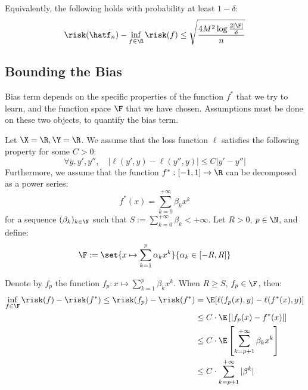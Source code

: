 \documentclass[toc, titlepaged]{../cs-classes/cs-classes}
\begin{document}
Equivalently, the following holds with probability at least $1-\delta$:
\begin{equation*}
    \risk(\hatf_n)-\inf_{f\in\R}\risk(f) \leq \sqrt{\frac{4M^2\log \frac{2|\F|}{\delta}}{n}}
\end{equation*}

\subsection{Bounding the Bias}
Bias term depends on the specific properties of the function $f^*$ that we try to learn, and the function space $\F$ that we have chosen. Assumptions must be done on these two objects, to quantify the bias term.

\begin{example}
    Let $\X=\R, \Y=\R$. We assume that the loss function $\ell$ satisfies the following property for some $C>0$:
    \begin{equation*}
        \forall y, y', y'', \quad |\ell(y', y)-\ell(y'', y)|\leq C|y'-y''|
    \end{equation*}
    Furthermore, we assume that the function $f^*:[-1, 1]\to\R$ can be decomposed as a power series:
    \begin{equation*}
        f^*(x) = \sum_{k=0}^{+\infty}\beta_kx^k
    \end{equation*}
    for a sequence $(\beta_k)_{k\in\N}$ such that $S:=\sum_{k=0}^{+\infty}\beta_k<+\infty$. Let $R>0$, $p\in\N$, and define:
    \begin{equation*}
        \F := \set{x\mapsto \sum_{k=1}^p\alpha_kx^k}{\alpha_k\in[-R, R]}
    \end{equation*}
    
    Denote by $f_p$ the function $f_p:x\mapsto \sum_{k=1}^p\beta_kx^k$. When $R\geq S$, $f_p\in\F$, then:
    \begin{equation*}
        \begin{aligned}
            \inf_{f\in\F}\risk(f)-\risk(f^*) \leq 
            \risk(f_p)-\risk(f^*) &= \E[\ell(f_p(x), y)-\ell(f^*(x), y)]\\
            &\leq C\cdot \E\left[\left|f_p(x)-f^*(x)\right|\right] \\
            &\leq C\cdot \E\left[\sum_{k=p+1}^{+\infty}\beta_kx^k\right] \\
            &\leq C\cdot \sum_{k=p+1}^{+\infty}|\beta^k|
        \end{aligned}
    \end{equation*}
\end{example}
\end{document}
